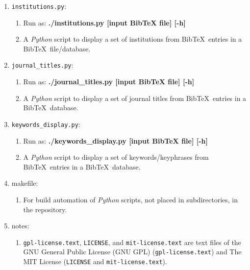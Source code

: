 \begin{enumerate}
\begin{enumerate}
	\item A set of {\sc Bib}\TeX\ files to test my {\it Python}-based {\sc Bib}\TeX\ {\it Analytics} software.
	\end{enumerate}
\item {\tt institutions.py}: \vspace{-0.3cm}
	\begin{enumerate} \itemsep -2pt
	\item Run as: {\bf ./institutions.py [input BibTeX file] [-h]}
	\item A {\it Python} script to display a set of institutions from {\sc Bib}\TeX\ entries in a {\sc Bib}\TeX\ file/database.
	\end{enumerate}
\item {\tt journal\_titles.py}: \vspace{-0.3cm}
	\begin{enumerate} \itemsep -2pt
	\item Run as: {\bf ./journal\_titles.py [input BibTeX file] [-h]}
	\item A {\it Python} script to display a set of journal titles from {\sc Bib}\TeX\ entries in a {\sc Bib}\TeX\ database.
	\end{enumerate}
\item {\tt keywords\_display.py}: \vspace{-0.3cm}
	\begin{enumerate} \itemsep -2pt
	\item Run as: {\bf ./keywords\_display.py [input BibTeX file] [-h]}
	\item A {\it Python} script to display a set of keywords/keyphrases from {\sc Bib}\TeX\ entries in a {\sc Bib}\TeX\ database.
	\end{enumerate}
\item makefile: \vspace{-0.3cm}
	\begin{enumerate} \itemsep -2pt
	\item For build automation of {\it Python} scripts, not placed in subdirectories, in the repository.
	\end{enumerate}
\item notes: \vspace{-0.3cm}
	\begin{enumerate} \itemsep -2pt
	\item {\tt gpl-license.text}, {\tt LICENSE}, and {\tt mit-license.text} are text files of the GNU General Public License (GNU GPL) ({\tt gpl-license.text}) and The MIT License ({\tt LICENSE} and {\tt mit-license.text}).

\end{enumerate}
\end{enumerate}
